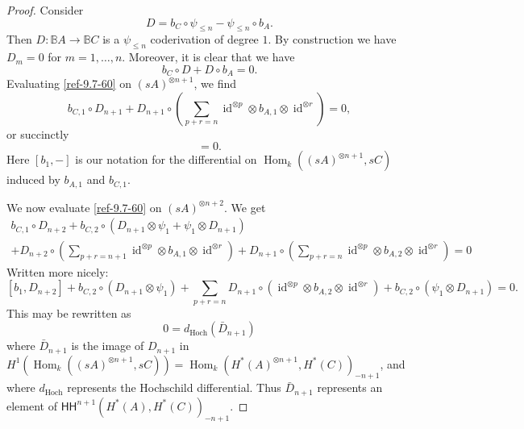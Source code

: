 \documentclass{amsart}
\numberwithin{equation}{section}
\theoremstyle{definition}
\theoremstyle{remark}
\begin{document}
\begin{proof}
 Consider
\begin{equation}
\label{ref-9.6-59}
D=b_C\circ \psi_{\le n}-\psi_{\le n} \circ b_A.
\end{equation}
Then $D:\mathbb{B}A{\rightarrow} \mathbb{B}C$ is a $\psi_{\le n}$ coderivation 
of degree $1$.
By construction we have $D_m=0$ for $m=1,\ldots,n$. Moreover, it is clear that we have
\begin{equation}
\label{ref-9.7-60}
b_C\circ D+D\circ b_A=0.
\end{equation}
Evaluating \eqref{ref-9.7-60} on $(sA)^{\otimes n+1}$,  we find 
\[
b_{C,1}\circ D_{n+1}+D_{n+1}\circ (\sum_{p+r=n} {\operatorname{id}}^{\otimes p}\otimes b_{A,1}\otimes {\operatorname{id}}^{\otimes r})=0,
\]
or succinctly
\begin{equation}
[b_1,D_{n+1}]=0.
\end{equation}
Here $[b_1,-]$ is our notation for the differential on ${\operatorname {Hom}}_k((sA)^{\otimes n+1},sC)$ induced by $b_{A,1}$ and $b_{C,1}$.

\medskip

We now evaluate \eqref{ref-9.7-60} on $(sA)^{\otimes n+2}$. We get
\begin{multline*}
b_{C,1}\circ D_{n+2}+ b_{C,2}\circ( D_{n+1}\otimes \psi_1+\psi_1\otimes D_{n+1})
\\
+D_{n+2}\circ (\sum_{p+r=n+1} {\operatorname{id}}^{\otimes p}\otimes b_{A,1}\otimes {\operatorname{id}}^{\otimes r})+D_{n+1}\circ (\sum_{p+r=n} {\operatorname{id}}^{\otimes p}\otimes b_{A,2}\otimes {\operatorname{id}}^{\otimes r})=0
\end{multline*}
Written more nicely:
\[
[b_1,D_{n+2}]+b_{C,2}\circ( D_{n+1}\otimes \psi_1)+\sum_{p+r=n} D_{n+1}\circ({\operatorname{id}}^{\otimes p}\otimes b_{A,2}\otimes {\operatorname{id}}^{\otimes r})
+ b_{C,2}\circ (\psi_1\otimes D_{n+1})=0.
\]
This may be rewritten as 
\begin{equation}
\label{ref-9.9-62}
0=d_{\text{Hoch}}(\bar{D}_{n+1})
\end{equation}
where $\bar{D}_{n+1}$ is the image of $D_{n+1}$ in $H^1({\operatorname {Hom}}_k((sA)^{\otimes n+1},sC))={\operatorname {Hom}}_k(H^\ast(A)^{\otimes n+1},H^\ast(C))_{-n+1}$,
and where $d_{\text{Hoch}}$ represents the Hochschild differential. Thus $\bar{D}_{n+1}$ represents an element
of ${\mathsf{HH}}^{n+1}(H^\ast(A),H^\ast(C))_{-n+1}$.
\medskip


\end{proof}
\end{document}
